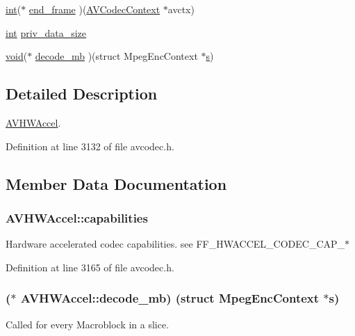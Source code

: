 \begin{DoxyCompactItemize}
\item 
\hyperlink{xmltok_8h_a5a0d4a5641ce434f1d23533f2b2e6653}{int}($\ast$ \hyperlink{struct_a_v_h_w_accel_ae7f4bdfa848f4c38bb6d9d059c11a297}{end\+\_\+frame} )(\hyperlink{struct_a_v_codec_context}{A\+V\+Codec\+Context} $\ast$avctx)
\item 
\hyperlink{xmltok_8h_a5a0d4a5641ce434f1d23533f2b2e6653}{int} \hyperlink{struct_a_v_h_w_accel_a0094df5ea13d644ebcba1237d45055be}{priv\+\_\+data\+\_\+size}
\item 
\hyperlink{sound_8c_ae35f5844602719cf66324f4de2a658b3}{void}($\ast$ \hyperlink{struct_a_v_h_w_accel_a78303ba4f7601306141d5f8bfe05d00e}{decode\+\_\+mb} )(struct Mpeg\+Enc\+Context $\ast$\hyperlink{lib_2expat_8h_a755339d27872b13735c2cab829e47157}{s})
\end{DoxyCompactItemize}


\subsection{Detailed Description}
\hyperlink{struct_a_v_h_w_accel}{A\+V\+H\+W\+Accel}. 

Definition at line 3132 of file avcodec.\+h.



\subsection{Member Data Documentation}
\subsubsection[{\texorpdfstring{capabilities}{capabilities}}]{ A\+V\+H\+W\+Accel\+::capabilities}\hypertarget{struct_a_v_h_w_accel_aa1da71a1cc27b60294023a893759e60a}{}\label{struct_a_v_h_w_accel_aa1da71a1cc27b60294023a893759e60a}
Hardware accelerated codec capabilities. see F\+F\+\_\+\+H\+W\+A\+C\+C\+E\+L\+\_\+\+C\+O\+D\+E\+C\+\_\+\+C\+A\+P\+\_\+$\ast$ 

Definition at line 3165 of file avcodec.\+h.

\subsubsection[{\texorpdfstring{decode\+\_\+mb}{decode_mb}}]{($\ast$ A\+V\+H\+W\+Accel\+::decode\+\_\+mb) (struct Mpeg\+Enc\+Context $\ast${\bf s})}\hypertarget{struct_a_v_h_w_accel_a78303ba4f7601306141d5f8bfe05d00e}{}\label{struct_a_v_h_w_accel_a78303ba4f7601306141d5f8bfe05d00e}
Called for every Macroblock in a slice.

